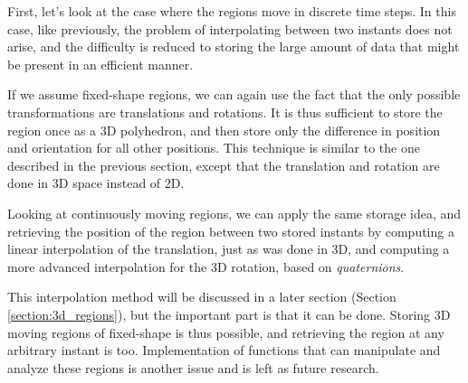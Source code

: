 First, let's look at the case where the regions move in discrete time steps. In this case, like previously, the problem of interpolating between two instants does not arise, and the difficulty is reduced to storing the large amount of data that might be present in an efficient manner. 

If we assume fixed-shape regions, we can again use the fact that the only possible transformations are translations and rotations. It is thus sufficient to store the region once as a 3D polyhedron, and then store only the difference in position and orientation for all other positions. This technique is similar to the one described in the previous section, except that the translation and rotation are done in 3D space instead of 2D.

Looking at continuously moving regions, we can apply the same storage idea, and retrieving the position of the region between two stored instants by computing a linear interpolation of the translation, just as was done in 3D, and computing a more advanced interpolation for the 3D rotation, based on \textit{quaternions}.

This interpolation method will be discussed in a later section (Section \ref{section:3d_regions}), but the important part is that it can be done. Storing 3D moving regions of fixed-shape is thus possible, and retrieving the region at any arbitrary instant is too. Implementation of functions that can manipulate and analyze these regions is another issue and is left as future research.